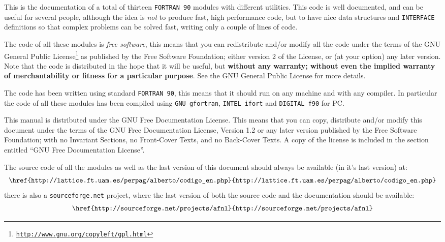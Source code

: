 
This is the documentation of a total of thirteen \texttt{FORTRAN 90}
modules with different utilities. This code is well documented, and
can be useful for several people, although the idea is \emph{not} to
produce fast, high performance code, but to have nice data structures
and \texttt{INTERFACE} definitions so that complex problems can be
solved fast, writing only a couple of lines of code. 

The code of all these modules is \emph{free software}, this means that
you can redistribute and/or modify all the code under the terms of the
GNU General Public
License\footnote{\href{http://www.gnu.org/copyleft/gpl.html}{\texttt{http://www.gnu.org/copyleft/gpl.html}}} 
as published by the Free Software Foundation; either version 2
of the License, or (at your option) any later version. Note that the
code is distributed in the hope that it will be useful, but
\textbf{without any warranty; without even the implied warranty of
  merchantability or fitness for a particular purpose}.  See the GNU
General Public License for more details. 

The code has been written using standard \texttt{FORTRAN 90}, this
means that it should run on any machine and with any compiler. In
particular the code of all these modules has been compiled using
\texttt{GNU gfortran}, \texttt{INTEL ifort} and \texttt{DIGITAL f90}
for PC.

This manual is distributed under the GNU Free Documentation
License. This means that you can copy, distribute and/or modify this
document under the terms of the GNU Free Documentation License,
Version 1.2 or any later version published by the Free Software
Foundation; with no Invariant Sections, no Front-Cover Texts, and no
Back-Cover Texts.  A copy of the license is included in the section
entitled ``GNU Free Documentation License''.

The source code of all the modules as well as the last version of this
document should always be available (in it's last version) at:
\begin{displaymath}
  \texttt{\href{http://lattice.ft.uam.es/perpag/alberto/codigo\_en.php}{\texttt{http://lattice.ft.uam.es/perpag/alberto/codigo\_en.php}}}
\end{displaymath}
there is also a \texttt{sourceforge.net} project, where the last
version of both the source code and the documentation should be
available:
\begin{displaymath}
  \texttt{\href{http://sourceforge.net/projects/afnl}{\texttt{http://sourceforge.net/projects/afnl}}}
\end{displaymath}

